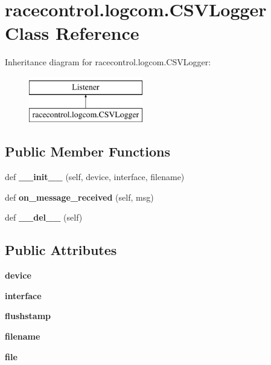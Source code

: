 \section{racecontrol.\+logcom.\+C\+S\+V\+Logger Class Reference}
\label{classracecontrol_1_1logcom_1_1CSVLogger}
Inheritance diagram for racecontrol.\+logcom.\+C\+S\+V\+Logger\+:\begin{figure}[H]
\begin{center}
\leavevmode
\includegraphics[height=2.000000cm]{classracecontrol_1_1logcom_1_1CSVLogger}
\end{center}
\end{figure}
\subsection*{Public Member Functions}
\begin{DoxyCompactItemize}
\item 
def {\bfseries \+\_\+\+\_\+init\+\_\+\+\_\+} (self, device, interface, filename)\label{classracecontrol_1_1logcom_1_1CSVLogger_a9c2aeb6deff0ce6f9543c8f56b02d684}

\item 
def {\bf on\+\_\+message\+\_\+received} (self, msg)
\item 
def {\bf \+\_\+\+\_\+del\+\_\+\+\_\+} (self)
\end{DoxyCompactItemize}
\subsection*{Public Attributes}
\begin{DoxyCompactItemize}
\item 
{\bfseries device}\label{classracecontrol_1_1logcom_1_1CSVLogger_a95f52b7ee93b7cffe3e90573f471445d}

\item 
{\bfseries interface}\label{classracecontrol_1_1logcom_1_1CSVLogger_a7699efcb2269db009a16a1d0480d69a6}

\item 
{\bfseries flushstamp}\label{classracecontrol_1_1logcom_1_1CSVLogger_a30078c3a214fefa381fcfccfbe4a3681}

\item 
{\bfseries filename}\label{classracecontrol_1_1logcom_1_1CSVLogger_a1224e8bf10827b6a7be2cc8ff4d60b35}

\item 
{\bfseries file}\label{classracecontrol_1_1logcom_1_1CSVLogger_a7673704993c47cf5adc04ff49512c1f0}

\end{DoxyCompactItemize}


